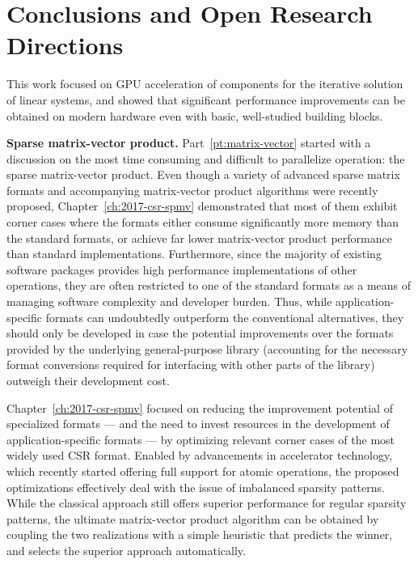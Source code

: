 \section{Conclusions and Open Research Directions}

This work focused on GPU acceleration of components for the iterative solution
of linear systems, and showed that significant performance improvements can be
obtained on modern hardware even with basic, well-studied building blocks.

\noindent \textbf{Sparse matrix-vector product.}
Part~\ref{pt:matrix-vector} started with a discussion on the most time
consuming and difficult to parallelize operation: the sparse matrix-vector
product. Even though a variety of advanced sparse matrix formats and
accompanying matrix-vector product algorithms were recently proposed,
Chapter~\ref{ch:2017-csr-spmv} demonstrated that most of them exhibit corner
cases where the formats either consume significantly more memory than the
standard formats, or achieve far lower matrix-vector product performance than
standard implementations. Furthermore, since the majority of existing software
packages provides high performance implementations of other operations, they are
often restricted to one of the standard formats as a means of managing software
complexity and developer burden. Thus, while application-specific formats can
undoubtedly outperform the conventional alternatives, they should only be
developed in case the potential improvements over the formats provided by the
underlying general-purpose library (accounting for the necessary format
conversions required for interfacing with other parts of the library) outweigh
their development cost.

Chapter~\ref{ch:2017-csr-spmv} focused on reducing the improvement potential of
specialized formats --- and the need to invest resources in the development of
application-specific formats --- by optimizing relevant corner cases of the most
widely used CSR format.  Enabled by advancements in accelerator technology,
which recently started offering full support for atomic operations, the proposed
optimizations effectively deal with the issue of imbalanced sparsity patterns.
While the classical approach still offers superior performance for regular
sparsity patterns, the ultimate matrix-vector product algorithm can be obtained
by coupling the two realizations with a simple heuristic that predicts the
winner, and selects the superior approach automatically.


